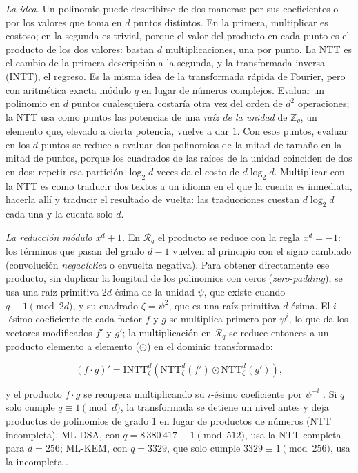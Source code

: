 \textit{La idea.} Un polinomio puede describirse de dos maneras: por sus coeficientes o por los valores que toma en $d$ puntos distintos. En la primera, multiplicar es costoso; en la segunda es trivial, porque el valor del producto en cada punto es el producto de los dos valores: bastan $d$ multiplicaciones, una por punto. La NTT es el cambio de la primera descripción a la segunda, y la transformada inversa (INTT), el regreso. Es la misma idea de la transformada rápida de Fourier, pero con aritmética exacta módulo $q$ en lugar de números complejos. Evaluar un polinomio en $d$ puntos cualesquiera costaría otra vez del orden de $d^2$ operaciones; la NTT usa como puntos las potencias de una \textit{raíz de la unidad} de $\mathbb{Z}_q$, un elemento que, elevado a cierta potencia, vuelve a dar $1$. Con esos puntos, evaluar en los $d$ puntos se reduce a evaluar dos polinomios de la mitad de tamaño en la mitad de puntos, porque los cuadrados de las raíces de la unidad coinciden de dos en dos; repetir esa partición $\log_2 d$ veces da el costo de $d \log_2 d$. Multiplicar con la NTT es como traducir dos textos a un idioma en el que la cuenta es inmediata, hacerla allí y traducir el resultado de vuelta: las traducciones cuestan $d \log_2 d$ cada una y la cuenta solo $d$.

\textit{La reducción módulo $x^d + 1$.} En $\mathcal{R}_q$ el producto se reduce con la regla $x^d = -1$: los términos que pasan del grado $d-1$ vuelven al principio con el signo cambiado (convolución \textit{negacíclica} o envuelta negativa). Para obtener directamente ese producto, sin duplicar la longitud de los polinomios con ceros (\textit{zero-padding}), se usa una raíz primitiva $2d$-ésima de la unidad $\psi$, que existe cuando $q \equiv 1 \pmod{2d}$, y su cuadrado $\zeta = \psi^2$, que es una raíz primitiva $d$-ésima. El $i$-ésimo coeficiente de cada factor $f$ y $g$ se multiplica primero por $\psi^i$, lo que da los vectores modificados $f'$ y $g'$; la multiplicación en $\mathcal{R}_q$ se reduce entonces a un producto elemento a elemento ($\odot$) en el dominio transformado:

\begin{equation}
(f \cdot g)' = \text{INTT}_{\zeta}^{d} \left( \text{NTT}_{\zeta}^{d}(f') \odot \text{NTT}_{\zeta}^{d}(g') \right),
\end{equation}

y el producto $f \cdot g$ se recupera multiplicando su $i$-ésimo coeficiente por $\psi^{-i}$ \cite{nguyen2019high}. Si $q$ solo cumple $q \equiv 1 \pmod{d}$, la transformada se detiene un nivel antes y deja productos de polinomios de grado 1 en lugar de productos de números (NTT incompleta). ML-DSA, con $q = 8\,380\,417 \equiv 1 \pmod{512}$, usa la NTT completa para $d = 256$; ML-KEM, con $q = 3329$, que solo cumple $3329 \equiv 1 \pmod{256}$, usa la incompleta \cite{nist2024fips203, nist2024fips204}.

